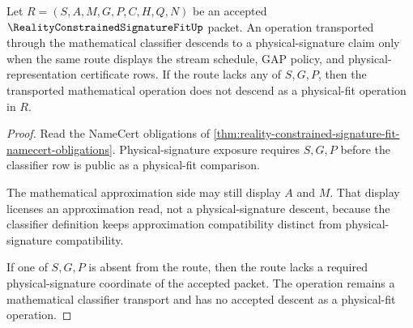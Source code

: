 \begin{theorem}
\label{thm:reality-constrained-signature-fit-no-free-descent}
Let $R=(S,A,M,G,P,C,H,Q,N)$ be an accepted $\RealityConstrainedSignatureFitUp$ packet. An operation transported through the mathematical classifier descends to a physical-signature claim only when the same route displays the stream schedule, GAP policy, and physical-representation certificate rows. If the route lacks any of $S,G,P$, then the transported mathematical operation does not descend as a physical-fit operation in $R$.
\end{theorem}
\begin{proof}
Read the NameCert obligations of \autoref{thm:reality-constrained-signature-fit-namecert-obligations}. Physical-signature exposure requires $S,G,P$ before the classifier row is public as a physical-fit comparison.

The mathematical approximation side may still display $A$ and $M$. That display licenses an approximation read, not a physical-signature descent, because the classifier definition keeps approximation compatibility distinct from physical-signature compatibility.

If one of $S,G,P$ is absent from the route, then the route lacks a required physical-signature coordinate of the accepted packet. The operation remains a mathematical classifier transport and has no accepted descent as a physical-fit operation.
\end{proof}

